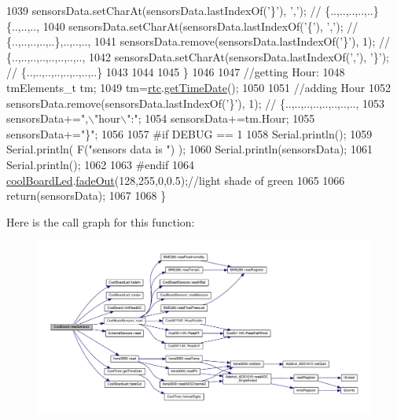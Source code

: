 \begin{DoxyCode}
1039         sensorsData.setCharAt(sensorsData.lastIndexOf(\textcolor{charliteral}{'\}'}), \textcolor{charliteral}{','}); \textcolor{comment}{// \{..,..,..,..,..\}\{..,..,..,}
1040         sensorsData.setCharAt(sensorsData.lastIndexOf(\textcolor{charliteral}{'\{'}), \textcolor{charliteral}{','}); \textcolor{comment}{// \{..,..,..,..,..\},..,..,..,}
1041         sensorsData.remove(sensorsData.lastIndexOf(\textcolor{charliteral}{'\}'}), 1); \textcolor{comment}{// \{..,..,..,..,..,..,..,..,}
1042         sensorsData.setCharAt(sensorsData.lastIndexOf(\textcolor{charliteral}{','}), \textcolor{charliteral}{'\}'}); \textcolor{comment}{// \{..,..,..,..,..,..,..,..\}      }
1043         
1044         
1045     \}
1046 
1047     \textcolor{comment}{//getting Hour:}
1048     tmElements\_t tm;
1049     tm=\hyperlink{class_cool_board_a50d2a6716879d64a85f3c6b44ad63275}{rtc}.\hyperlink{class_cool_time_a7a7501c5ca77dd1248bea704c44f986c}{getTimeDate}();
1050     
1051     \textcolor{comment}{//adding Hour}
1052     sensorsData.remove(sensorsData.lastIndexOf(\textcolor{charliteral}{'\}'}), 1); \textcolor{comment}{// \{..,..,..,..,..,..,..,..,   }
1053     sensorsData+=\textcolor{stringliteral}{",\(\backslash\)"hour\(\backslash\)":"};  
1054     sensorsData+=tm.Hour;
1055     sensorsData+=\textcolor{stringliteral}{"\}"};
1056     
1057 \textcolor{preprocessor}{#if DEBUG == 1}
1058     Serial.println();
1059     Serial.println( F(\textcolor{stringliteral}{"sensors data is "}) );
1060     Serial.println(sensorsData);
1061     Serial.println();
1062 
1063 \textcolor{preprocessor}{#endif}
1064     \hyperlink{class_cool_board_a1b1d3c684a5baa56b08486e192fd8e97}{coolBoardLed}.\hyperlink{class_cool_board_led_a93d545679237e8cc858324367149775c}{fadeOut}(128,255,0,0.5);\textcolor{comment}{//light shade of green}
1065 
1066     \textcolor{keywordflow}{return}(sensorsData);
1067 
1068 \}
\end{DoxyCode}
Here is the call graph for this function\+:\nopagebreak
\begin{figure}[H]
\begin{center}
\leavevmode
\includegraphics[width=350pt]{d7/df9/class_cool_board_ad03abdce2e65f520bbf2cff0f2d083cf_cgraph}
\end{center}
\end{figure}
